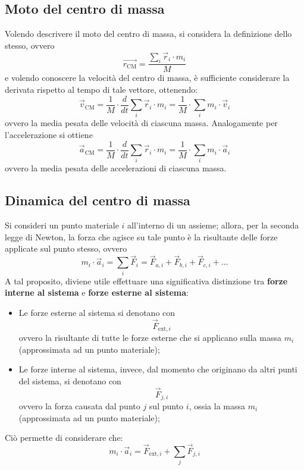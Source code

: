 \documentclass[a4paper]{extarticle}
\begin{document}
\vspace{1em}
\subsection{Moto del centro di massa}
Volendo descrivere il moto del centro di massa, si considera la definizione dello stesso, ovvero
\[\vec{r_{\text{CM}}} = \frac{\displaystyle{\sum_{i} \vec r_i \cdot m_i}}{M}\]
e volendo conoscere la velocità del centro di massa, è sufficiente considerare la derivata rispetto al tempo di tale vettore, ottenendo:
\[\vec v_{\text{CM}} = \frac{1}{M} \cdot \frac{d}{dt} \sum_i \vec r_i \cdot m_i = \frac{1}{M} \cdot \sum_i m_i \cdot \vec v_i\]
ovvero la media pesata delle velocità di ciascuna massa. Analogamente per l'accelerazione si ottiene
\[\vec a_{\text{CM}} = \frac{1}{M} \cdot \frac{d}{dt} \sum_i \vec r_i \cdot m_i = \frac{1}{M} \cdot \sum_i m_i \cdot \vec a_i\]
ovvero la media pesata delle accelerazioni di ciascuna massa.

\vspace{1em}
\subsection{Dinamica del centro di massa}
Si consideri un punto materiale $i$ all'interno di un assieme; allora, per la seconda legge di Newton, la forza che agisce su tale punto è la risultante delle forze applicate sul punto stesso, ovvero
\[m_i \cdot \vec a_i = \sum_i \vec F_i = \vec F_{a,i} + \vec F_{b,i} + \vec F_{c,i} + ...\]
A tal proposito, diviene utile effettuare una significativa distinzione tra \textbf{forze interne al sistema} e \textbf{forze esterne al sistema}:
\begin{itemize}
  \item Le forze esterne al sistema si denotano con
  \[\vec F_{\text{ext},i}\]
  ovvero la risultante di tutte le forze esterne che si applicano sulla massa $m_i$ (approssimata ad un punto materiale);

  \item Le forze interne al sistema, invece, dal momento che originano da altri punti del sistema, si denotano con
  \[\vec F_{j,i}\]
  ovvero la forza causata dal punto $j$ sul punto $i$, ossia la massa $m_i$ (approssimata ad un punto materiale);
\end{itemize}
Ciò permette di considerare che:
\[\boxed{m_i \cdot \vec a_i = \vec F_{\text{ext},i} + \sum_j \vec F_{j,i}}\]
\end{document}
